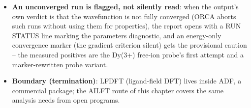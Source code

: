 \begin{readbox}
\begin{itemize}
    the model's business, and the two-shell parameter spaces are covered
    by the manual's LFTCase list.
  \item \textbf{An unconverged run is flagged, not silently read}: when the
    output's own verdict is that the wavefunction is not fully converged
    (ORCA aborts such runs without using them for properties), the report
    opens with a RUN STATUS line marking the parameters diagnostic, and an
    energy-only convergence marker (the gradient criterion silent) gets the
    provisional caution -- the measured positives are the Dy(3+) free-ion
    probe's first attempt and a marker-rewritten probe variant.
  \item \textbf{Boundary (termination)}: LFDFT (ligand-field DFT) lives
    inside ADF, a commercial package; the AILFT
    route of this chapter covers the same analysis needs from open programs.
\end{itemize}
\end{readbox}
